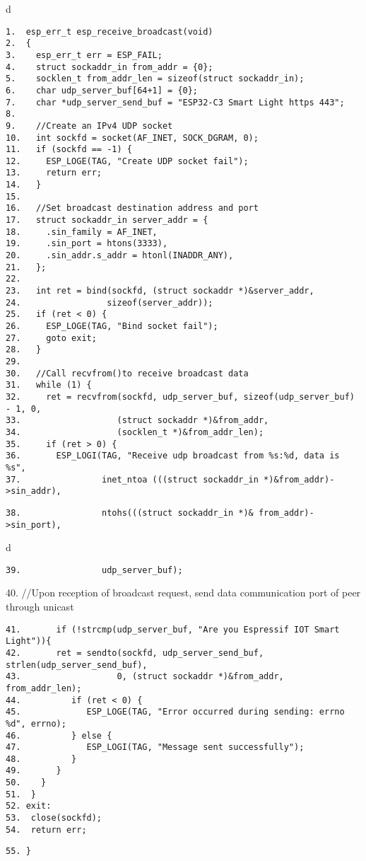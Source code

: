 \documentclass[a4paper,12pt]{book}
\begin{document}
\begin{codebloc}
\begin{tabular}{d}
\vspace{2pt}
\begin{verbatim}
1.  esp_err_t esp_receive_broadcast(void)
2.  {
3.    esp_err_t err = ESP_FAIL;
4.    struct sockaddr_in from_addr = {0};
5.    socklen_t from_addr_len = sizeof(struct sockaddr_in);
6.    char udp_server_buf[64+1] = {0};
7.    char *udp_server_send_buf = "ESP32-C3 Smart Light https 443";
8. 	 
9.    //Create an IPv4 UDP socket
10.   int sockfd = socket(AF_INET, SOCK_DGRAM, 0);
11.   if (sockfd == -1) {
12.     ESP_LOGE(TAG, "Create UDP socket fail");
13.     return err;
14.   }
15. 	 
16.   //Set broadcast destination address and port
17.   struct sockaddr_in server_addr = {
18.     .sin_family = AF_INET,
19.     .sin_port = htons(3333),
20.     .sin_addr.s_addr = htonl(INADDR_ANY),
21.   };
22. 	 
23.   int ret = bind(sockfd, (struct sockaddr *)&server_addr,
24.                 sizeof(server_addr));
25.   if (ret < 0) {
26.     ESP_LOGE(TAG, "Bind socket fail");
27.     goto exit;
28.   }
29. 	 
30.   //Call recvfrom()to receive broadcast data
31.   while (1) {
32.     ret = recvfrom(sockfd, udp_server_buf, sizeof(udp_server_buf) - 1, 0,
33.                   (struct sockaddr *)&from_addr,
34.                   (socklen_t *)&from_addr_len);
35.     if (ret > 0) {
36.       ESP_LOGI(TAG, "Receive udp broadcast from %s:%d, data is %s",
37.                inet_ntoa (((struct sockaddr_in *)&from_addr)->sin_addr),
\end{verbatim}
\verb|38.                ntohs(((struct sockaddr_in *)& from_addr)->sin_port),|
\end{tabular}
\end{codebloc}

\begin{codebloc}
\begin{tabular}{d}
\vspace{2pt}
\begin{verbatim}
39.                udp_server_buf);
\end{verbatim}
40. \fontsize{8pt}{10pt}\selectfont//Upon reception of broadcast request, send data communication port of peer through unicast
\footnotesize
\begin{verbatim}
41.       if (!strcmp(udp_server_buf, "Are you Espressif IOT Smart Light")){
42.       ret = sendto(sockfd, udp_server_send_buf, strlen(udp_server_send_buf),
43.                   0, (struct sockaddr *)&from_addr, from_addr_len);
44.          if (ret < 0) {
45.             ESP_LOGE(TAG, "Error occurred during sending: errno %d", errno);
46.          } else {
47.             ESP_LOGI(TAG, "Message sent successfully");
48.          }
49.       }
50.    }
51.  }
52. exit:
53.  close(sockfd);
54.  return err;
\end{verbatim}
\verb|55. }|
\end{tabular}
\end{codebloc}
\end{document}
